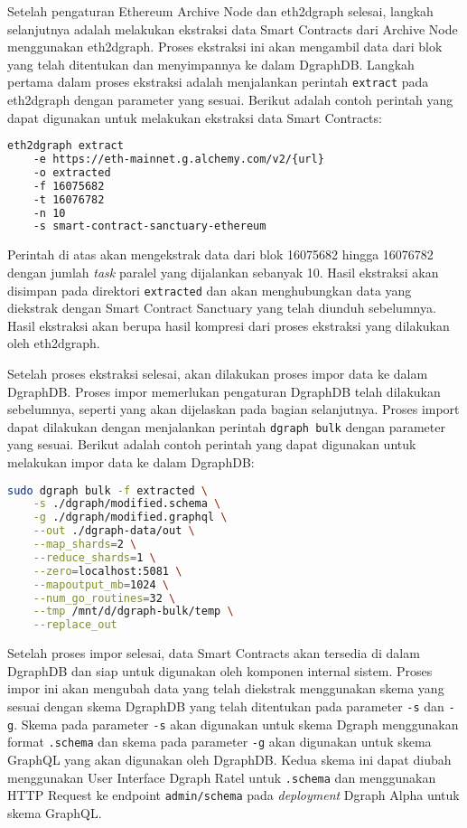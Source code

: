 Setelah pengaturan Ethereum Archive Node dan eth2dgraph selesai, langkah selanjutnya adalah melakukan ekstraksi data Smart Contracts dari Archive Node menggunakan eth2dgraph. Proses ekstraksi ini akan mengambil data dari blok yang telah ditentukan dan menyimpannya ke dalam DgraphDB. Langkah pertama dalam proses ekstraksi adalah menjalankan perintah \texttt{extract} pada eth2dgraph dengan parameter yang sesuai. Berikut adalah contoh perintah yang dapat digunakan untuk melakukan ekstraksi data Smart Contracts:

\begin{lstlisting}[language=bash]
    eth2dgraph extract 
    -e https://eth-mainnet.g.alchemy.com/v2/{url}
    -o extracted 
    -f 16075682 
    -t 16076782 
    -n 10 
    -s smart-contract-sanctuary-ethereum
\end{lstlisting}

Perintah di atas akan mengekstrak data dari blok 16075682 hingga 16076782 dengan jumlah \textit{task} paralel yang dijalankan sebanyak 10. Hasil ekstraksi akan disimpan pada direktori \texttt{extracted} dan akan menghubungkan data yang diekstrak dengan Smart Contract Sanctuary yang telah diunduh sebelumnya. Hasil ekstraksi akan berupa hasil kompresi dari proses ekstraksi yang dilakukan oleh eth2dgraph.

Setelah proses ekstraksi selesai, akan dilakukan proses impor data ke dalam DgraphDB. Proses impor memerlukan pengaturan DgraphDB telah dilakukan sebelumnya, seperti yang akan dijelaskan pada bagian selanjutnya. Proses import dapat dilakukan dengan menjalankan perintah \texttt{dgraph bulk} dengan parameter yang sesuai. Berikut adalah contoh perintah yang dapat digunakan untuk melakukan impor data ke dalam DgraphDB:

\begin{lstlisting}[language=bash]
    sudo dgraph bulk -f extracted \
    -s ./dgraph/modified.schema \
    -g ./dgraph/modified.graphql \
    --out ./dgraph-data/out \
    --map_shards=2 \
    --reduce_shards=1 \
    --zero=localhost:5081 \
    --mapoutput_mb=1024 \
    --num_go_routines=32 \
    --tmp /mnt/d/dgraph-bulk/temp \
    --replace_out
\end{lstlisting}

Setelah proses impor selesai, data Smart Contracts akan tersedia di dalam DgraphDB dan siap untuk digunakan oleh komponen internal sistem. Proses impor ini akan mengubah data yang telah diekstrak menggunakan skema yang sesuai dengan skema DgraphDB yang telah ditentukan pada parameter \texttt{-s} dan \texttt{-g}. Skema pada parameter \texttt{-s} akan digunakan untuk skema Dgraph menggunakan format \texttt{.schema} dan skema pada parameter \texttt{-g} akan digunakan untuk skema GraphQL yang akan digunakan oleh DgraphDB. Kedua skema ini dapat diubah menggunakan User Interface Dgraph Ratel untuk \texttt{.schema} dan menggunakan HTTP Request ke endpoint \texttt{admin/schema} pada \textit{deployment} Dgraph Alpha untuk skema GraphQL.

